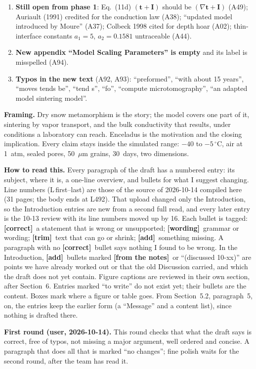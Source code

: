 \documentclass[11pt]{article}
\newcommand{\Note}{\textcolor{open}{\textbf{[from the notes]}}\ }
\newcommand{\tC}{\textcolor{miss}{\textbf{[correct]}}\ }
\newcommand{\tG}{\textcolor{stale}{\textbf{[wording]}}\ }
\newcommand{\tT}{\textcolor{cut}{\textbf{[trim]}}\ }
\newcommand{\tA}{\textcolor{have}{\textbf{[add]}}\ }
\newcommand{\add}[1]{\textcolor{revA}{#1}}
\begin{document}
\begin{enumerate}
\item \add{\textbf{Still open from phase 1}: Eq.~(11d) $(\mathbf{t}+\mathbf{I})$ should be $(\nabla\mathbf{t}+\mathbf{I})$ (A49); Auriault (1991) credited for the conduction law (A38); ``updated model introduced by Moure'' (A37); Colbeck 1998 cited for depth hoar (A02); thin-interface constants $a_1 = 5$, $a_2 = 0.1581$ untraceable (A44).}
\item \add{\textbf{New appendix ``Model Scaling Parameters'' is empty} and its label is misspelled (A94).}
\item \add{\textbf{Typos in the new text} (A92, A93): ``preformed'', ``with about 15 years'', ``moves tends be'', ``tend s'', ``fo'', ``compute microtomography'', ``an adapted model sintering model''.}
\end{enumerate}

\textbf{Framing.} Dry snow metamorphism is the story; the model covers one
part of it, sintering by vapor transport, and the bulk conductivity that
results, under conditions a laboratory can reach. Enceladus is the motivation
and the closing implication. Every claim stays inside the simulated range:
$-40$ to $-5\,^{\circ}$C, air at 1~atm, sealed pores, 50~$\mu$m grains,
30~days, two dimensions.

\textbf{How to read this.} Every paragraph of the draft has a numbered
entry: its subject, where it is, a one-line overview, and bullets for what I
suggest changing. Line numbers (L\,first--last) are those of the source of
2026-10-14 compiled here (31 pages; the body ends at L492). That upload
changed only the Introduction, so the Introduction entries are new from a
second full read, and every later entry is the 10-13 review with its line
numbers moved up by 16. Each bullet is tagged:
\tC a statement that is wrong or unsupported;
\tG grammar or wording;
\tT text that can go or shrink;
\tA something missing.
A paragraph with no \tC bullet says nothing I found to be wrong. In the
Introduction, \tA bullets marked \Note or ``(discussed 10-xx)'' are points we
have already worked out or that the old Discussion carried, and which the
draft does not yet contain. Figure captions are reviewed in their own
section, after Section~6. Entries
marked ``to write'' do not exist yet; their bullets are the content. Boxes
mark where a figure or table goes. From Section~5.2, paragraph~5, on, the
entries keep the earlier form (a ``Message'' and a content list), since
nothing is drafted there.

\textbf{First round (user, 2026-10-14).} This round checks that what the
draft says is correct, free of typos, not missing a major argument, well
ordered and concise. A paragraph that does all that is marked ``no changes'';
fine polish waits for the second round, after the team has read it.
\end{document}
